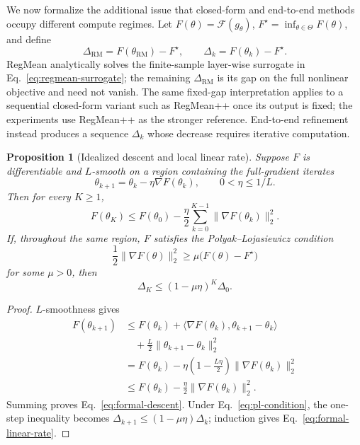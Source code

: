 \documentclass[letterpaper]{article} %
\theoremstyle{plain}
\newtheorem{proposition}[theorem]{Proposition}
\theoremstyle{definition}
\begin{document}
We now formalize the additional issue that closed-form and end-to-end methods occupy
different compute regimes. Let $F(\theta)=\mathcal F(g_\theta)$,
$F^\star=\inf_{\theta\in\Theta}F(\theta)$, and define
\begin{equation}
\Delta_{\mathrm{RM}}=F(\theta_{\mathrm{RM}})-F^\star,
\qquad
\Delta_k=F(\theta_k)-F^\star.
\label{eq:formal-gaps}
\end{equation}
RegMean analytically solves the finite-sample layer-wise surrogate in
Eq.~\eqref{eq:regmean-surrogate}; the remaining $\Delta_{\mathrm{RM}}$ is its gap on the
full nonlinear objective and need not vanish. The same fixed-gap interpretation applies
to a sequential closed-form variant such as RegMean++ once its output is fixed; the
experiments use RegMean++ as the stronger reference. End-to-end refinement instead
produces a sequence $\Delta_k$ whose decrease requires iterative computation.

\begin{proposition}[Idealized descent and local linear rate]
\label{prop:compute-error-formal}
Suppose $F$ is differentiable and $L$-smooth on a region containing the full-gradient
iterates
\begin{equation}
\theta_{k+1}=\theta_k-\eta\nabla F(\theta_k),
\qquad 0<\eta\le 1/L.
\label{eq:idealized-gd}
\end{equation}
Then for every $K\ge1$,
\begin{equation}
F(\theta_K)
\le
F(\theta_0)-\frac{\eta}{2}
\sum_{k=0}^{K-1}\|\nabla F(\theta_k)\|_2^2.
\label{eq:formal-descent}
\end{equation}
If, throughout the same region, $F$ satisfies the Polyak--Lojasiewicz condition
\begin{equation}
\frac12\|\nabla F(\theta)\|_2^2
\ge \mu\bigl(F(\theta)-F^\star\bigr)
\label{eq:pl-condition}
\end{equation}
for some $\mu>0$, then
\begin{equation}
\Delta_K\le(1-\mu\eta)^K\Delta_0.
\label{eq:formal-linear-rate}
\end{equation}
\end{proposition}

\begin{proof}
$L$-smoothness gives
\begin{align*}
F(\theta_{k+1})
&\le F(\theta_k)
+\langle\nabla F(\theta_k),
  \theta_{k+1}-\theta_k\rangle \\
&\quad +\frac L2
  \|\theta_{k+1}-\theta_k\|_2^2 \\
&=F(\theta_k)-\eta\left(1-\frac{L\eta}{2}\right)
  \|\nabla F(\theta_k)\|_2^2 \\
&\le F(\theta_k)-\frac\eta2
  \|\nabla F(\theta_k)\|_2^2.
\end{align*}
Summing proves Eq.~\eqref{eq:formal-descent}. Under
Eq.~\eqref{eq:pl-condition}, the one-step inequality becomes
$\Delta_{k+1}\le(1-\mu\eta)\Delta_k$; induction gives
Eq.~\eqref{eq:formal-linear-rate}.
\end{proof}
\end{document}
